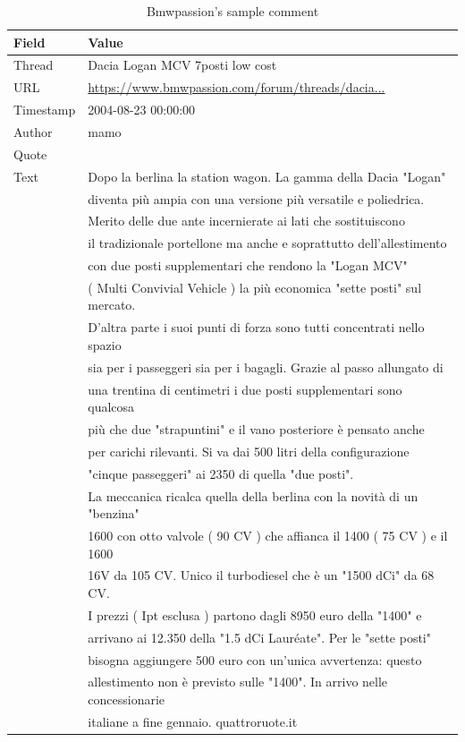 \begin{table}[ht]
	\centering
	\begin{tabular}{l | l}
		Field & Value \\
		\hline 
		Thread & Dacia Logan MCV 7posti low cost \\
		URL & \url{https://www.bmwpassion.com/forum/threads/dacia...}\\
		Timestamp & 2004-08-23 00:00:00\\
		Author & mamo\\
		Quote & \\
		Text & Dopo la berlina la station wagon. La gamma della Dacia "Logan"\\& diventa più ampia con una versione più versatile e poliedrica.\\& Merito delle due ante incernierate ai lati che sostituiscono\\& il tradizionale portellone ma anche e soprattutto dell'allestimento\\& con due posti supplementari che rendono la "Logan MCV"\\& ( Multi Convivial Vehicle ) la più economica "sette posti" sul mercato.\\& D'altra parte i suoi punti di forza sono tutti concentrati nello spazio\\& sia per i passeggeri sia per i bagagli. Grazie al passo allungato di\\& una trentina di centimetri i due posti supplementari sono qualcosa\\& più che due "strapuntini" e il vano posteriore è pensato anche\\& per carichi rilevanti. Si va dai 500 litri della configurazione\\& "cinque passeggeri" ai 2350 di quella "due posti".\\& La meccanica ricalca quella della berlina con la novità di un "benzina"\\& 1600 con otto valvole ( 90 CV ) che affianca il 1400 ( 75 CV ) e il 1600\\& 16V da 105 CV. Unico il turbodiesel che è un "1500 dCi" da 68 CV.\\& I prezzi ( Ipt esclusa ) partono dagli 8950 euro della "1400" e\\& arrivano ai 12.350 della "1.5 dCi Lauréate". Per le "sette posti"\\& bisogna aggiungere 500 euro con un'unica avvertenza: questo\\& allestimento non è previsto sulle "1400". In arrivo nelle concessionarie\\& italiane a fine gennaio. quattroruote.it 
	\end{tabular}
	\caption{Bmwpassion's sample comment}
	\label{tab:bmwpassion-comment}
\end{table}

